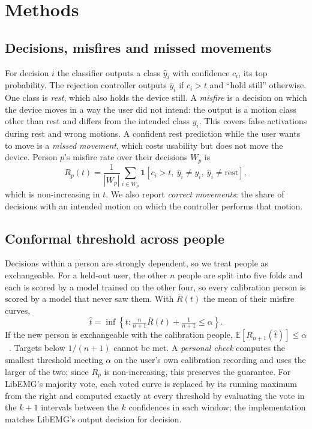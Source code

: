 \documentclass[conference]{IEEEtran}
\newcommand{\target}{\alpha}
\begin{document}
\section{Methods}

\subsection{Decisions, misfires and missed movements}
For decision $i$ the classifier outputs a class $\hat y_i$ with confidence $c_i$, its top probability. The rejection controller outputs $\hat y_i$ if $c_i>t$ and ``hold still'' otherwise. One class is \emph{rest}, which also holds the device still. A \emph{misfire} is a decision on which the device moves in a way the user did not intend: the output is a motion class other than rest and differs from the intended class $y_i$. This covers false activations during rest and wrong motions. A confident rest prediction while the user wants to move is a \emph{missed movement}, which costs usability but does not move the device. Person $p$'s misfire rate over their decisions $W_p$ is
\begin{equation}
R_p(t) = \frac{1}{|W_p|}\sum_{i\in W_p} \mathbf{1}\left[c_i > t,\ \hat y_i \ne y_i,\ \hat y_i \ne \text{rest}\right],
\end{equation}
which is non-increasing in $t$. We also report \emph{correct movements}: the share of decisions with an intended motion on which the controller performs that motion.

\subsection{Conformal threshold across people}
Decisions within a person are strongly dependent, so we treat people as exchangeable. For a held-out user, the other $n$ people are split into five folds and each is scored by a model trained on the other four, so every calibration person is scored by a model that never saw them. With $\bar R(t)$ the mean of their misfire curves,
\begin{equation}
\hat t = \inf\left\{t : \tfrac{n}{n+1}\bar R(t) + \tfrac{1}{n+1} \le \target\right\}.
\end{equation}
If the new person is exchangeable with the calibration people, $\mathbb{E}[R_{n+1}(\hat t)] \le \target$~\cite{angelopoulos2024}. Targets below $1/(n+1)$ cannot be met. A \emph{personal check} computes the smallest threshold meeting $\target$ on the user's own calibration recording and uses the larger of the two; since $R_p$ is non-increasing, this preserves the guarantee. For LibEMG's majority vote, each voted curve is replaced by its running maximum from the right and computed exactly at every threshold by evaluating the vote in the $k+1$ intervals between the $k$ confidences in each window; the implementation matches LibEMG's output decision for decision.
\end{document}
